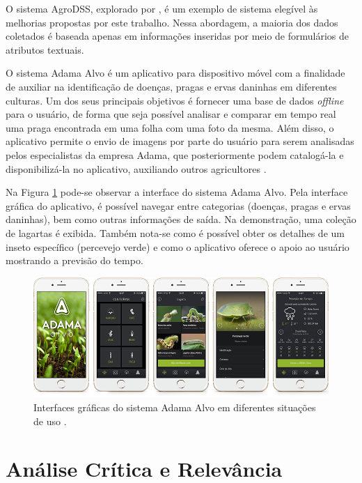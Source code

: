 \documentclass[12pt]{article}
\begin{document}
O sistema AgroDSS, explorado por , é um exemplo de sistema elegível às melhorias propostas por este trabalho. Nessa abordagem, a maioria dos dados coletados é baseada apenas em informações inseridas por meio de formulários de atributos textuais.

O sistema Adama Alvo é um aplicativo para dispositivo móvel com a finalidade de auxiliar na identificação de doenças, pragas e ervas daninhas em diferentes culturas. Um dos seus principais objetivos é fornecer uma base de dados \textit{offline} para o usuário, de forma que seja possível analisar e comparar em tempo real uma praga encontrada em uma folha com uma foto da mesma. Além disso, o aplicativo permite o envio de imagens por parte do usuário para serem analisadas pelos especialistas da empresa Adama, que posteriormente podem catalogá-la e disponibilizá-la no aplicativo, auxiliando outros agricultores \cite{AdamaAlvo:2020}.

Na Figura \ref{fig:adamalvo} pode-se observar a interface do sistema Adama Alvo. Pela interface gráfica do aplicativo, é possível navegar entre categorias (doenças, pragas e ervas daninhas), bem como outras informações de saída. Na demonstração, uma coleção de lagartas é exibida. Também nota-se como é possível obter os detalhes de um inseto específico (percevejo verde) e como o aplicativo oferece o apoio ao usuário mostrando a previsão do tempo.

\begin{figure}[!htb]
	\centering
  \includegraphics[scale=0.5]{images/AdamaAlvo.png}
  \caption{Interfaces gráficas do sistema Adama Alvo em diferentes situações de uso \cite{AdamaAlvo:2020}.}
  \label{fig:adamalvo}
\end{figure}

\section{Análise Crítica e Relevância}
\label{sec:analise_critica_relevancia}
\end{document}
